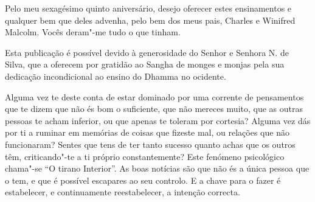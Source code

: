 \clearpage
\thispagestyle{empty}

{}

\vspace*{0.8\baselineskip}

Pelo meu sexagésimo quinto aniversário, desejo oferecer estes
ensinamentos e qualquer bem que deles advenha, pelo bem dos meus pais,
Charles e Winifred Malcolm. Vocês deram"-me tudo o que tinham.

\clearpage
\thispagestyle{empty}

{}

\enlargethispage*{\baselineskip}

\vspace*{0.8\baselineskip}

Esta publicação é possível devido à generosidade do Senhor e Senhora N.
de Silva, que a oferecem por gratidão ao Sangha de monges e monjas pela
sua dedicação incondicional ao ensino do Dhamma no ocidente.

Alguma vez te deste conta de estar dominado por uma corrente de
pensamentos que te dizem que não és bom o suficiente, que não mereces
muito, que as outras pessoas te acham inferior, ou que apenas te toleram
por cortesia? Alguma vez dás por ti a ruminar em memórias de coisas que
fizeste mal, ou relações que não funcionaram? Sentes que tens de ter
tanto sucesso quanto achas que os outros têm, criticando"-te a ti próprio
constantemente? Este fenómeno psicológico chama"-se “O tirano Interior”.
As boas notícias são que não és a única pessoa que o tem, e que é
possível escapares ao seu controlo. E a chave para o fazer é
estabelecer, e continuamente reestabelecer, a intenção correcta.

